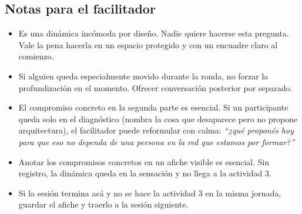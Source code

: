 \documentclass[11pt, a4paper]{article}
\begin{document}
\begin{actividad}
\subsection*{Notas para el facilitador}
\begin{itemize}
  \item Es una dinámica incómoda por diseño. Nadie quiere hacerse esta pregunta. Vale la pena hacerla en un espacio protegido y con un encuadre claro al comienzo.
  \item Si alguien queda especialmente movido durante la ronda, no forzar la profundización en el momento. Ofrecer conversación posterior por separado.
  \item El compromiso concreto en la segunda parte es esencial. Si un participante queda solo en el diagnóstico (nombra la cosa que desaparece pero no propone arquitectura), el facilitador puede reformular con calma: \emph{``¿qué proponés hoy para que eso no dependa de una persona en la red que estamos por formar?''}
  \item Anotar los compromisos concretos en un afiche visible es esencial. Sin registro, la dinámica queda en la sensación y no llega a la actividad 3.
  \item Si la sesión termina acá y no se hace la actividad 3 en la misma jornada, guardar el afiche y traerlo a la sesión siguiente.
\end{itemize}

\end{actividad}

\newpage
\end{document}
